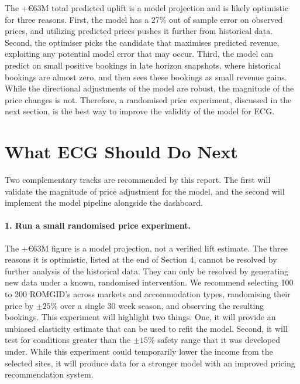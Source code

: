 \documentclass[11pt,a4paper]{article}
\begin{document}
The +\euro{}63M total predicted uplift is a model projection and is likely optimistic for three reasons. First, the model has a 27\% out of sample error on observed prices, and utilizing predicted prices pushes it further from historical data. Second, the optimiser picks the candidate that maximises predicted revenue, exploiting any potential model error that may occur. Third, the model can predict on small positive bookings in late horizon snapshots, where historical bookings are almost zero, and then sees these bookings as small revenue gains. While the directional adjustments of the model are robust, the magnitude of the price changes is not. Therefore, a randomised price experiment, discussed in the next section, is the best way to improve the validity of the model for ECG.

\section{What ECG Should Do Next}

Two complementary tracks are recommended by this report. The first will validate the magnitude of price adjustment for the model, and the second will implement the model pipeline alongside the dashboard.

\paragraph{1. Run a small randomised price experiment.} The +\euro{}63M figure is a model projection, not a verified lift estimate. The three reasons it is optimistic, listed at the end of Section 4, cannot be resolved by further analysis of the historical data. They can only be resolved by generating new data under a known, randomised intervention. We recommend selecting 100 to 200 ROMGID's across markets and accommodation types, randomising their price by $\pm 25\%$ over a single 30 week season, and observing the resulting bookings. This experiment will highlight two things. One, it will provide an unbiased elasticity estimate that can be used to refit the model. Second, it will test for conditions greater than the $\pm 15\%$ safety range that it was developed under. While this experiment could temporarily lower the income from the selected sites, it will produce data for a stronger model with an improved pricing recommendation system.
\end{document}
